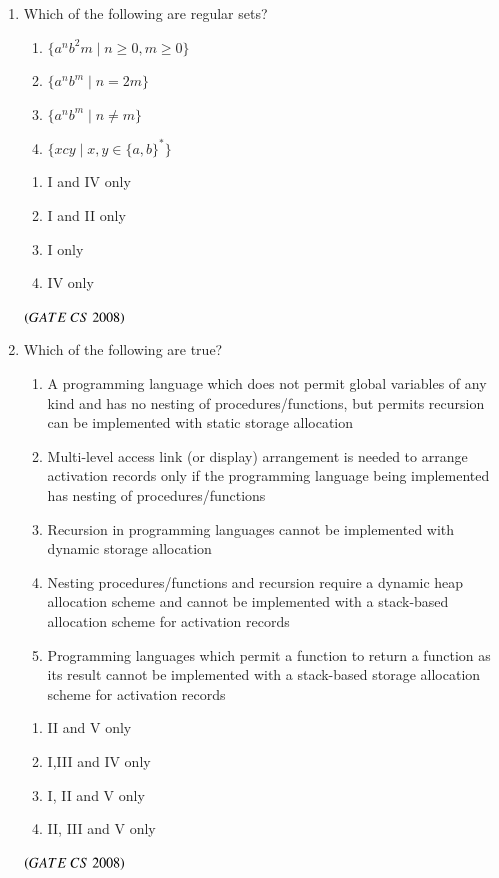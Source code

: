 \documentclass[journal, onecolumn]{IEEEtran}
\numberwithin{equation}{enumi}
\numberwithin{figure}{enumi}
\begin{document}
\begin{enumerate}
\item Which of the following are regular sets?
\begin{enumerate}[label=\Roman*.]
    \item $\{a^n b^2m \mid n \geq 0, m \geq 0\}$
    \item $\{a^n b^m \mid n = 2m\}$
    \item $\{a^n b^m \mid n \not= m\}$
    \item $\{xcy \mid x, y \in \{a,b\}^*\}$
\end{enumerate}
\vspace{-1em}%
\begin{multicols}{4}
\begin{enumerate}
    \item I and IV only
    \item I and II only
    \item I only
    \item IV only
\end{enumerate}
\end{multicols}
\hfill $\left(GATE\ CS\  2008\right)$
\bigskip

\item Which of the following are true?
\begin{enumerate}[label=\Roman*.]
   \item A programming language which does not permit global variables of any kind and has no nesting of procedures/functions, but permits recursion can be implemented with static storage allocation
  \item Multi-level access link (or display) arrangement is needed to arrange activation records only if the programming language being implemented has nesting of procedures/functions
  \item Recursion in programming languages cannot be implemented with dynamic storage allocation
  \item Nesting procedures/functions and recursion require a dynamic heap allocation scheme and cannot be implemented with a stack-based allocation
scheme for activation records
  \item Programming languages which permit a function to return a function as its result cannot be implemented with a stack-based storage allocation scheme for activation records
\end{enumerate}
 \vspace{-1em}%
\begin{multicols}{2}
\begin{enumerate}
    \item II and V only
    \item I,III and IV only
    \item I, II and V only
    \item II, III and V only
\end{enumerate}
\end{multicols}
\hfill $\left(GATE\ CS\  2008\right)$


\end{enumerate}
\end{document}
